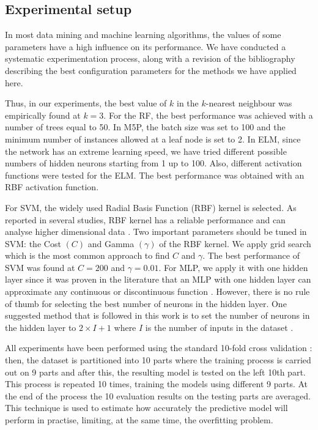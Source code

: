 \documentclass[a4paper,10pt,twocolumn,preprint,3p]{elsarticle}
\begin{document}

\subsection{Experimental setup}

In most data mining and machine learning algorithms, the values of some 
parameters have a high influence on its performance. We have conducted a 
systematic experimentation process, along with a revision of the bibliography 
describing the best configuration parameters for the methods we have applied here. 

Thus, in our experiments, the best value of $k$ in the $k$-nearest neighbour 
was empirically found at $k=3$. For the RF, the best performance was achieved with a number of trees equal to 50. In M5P, the batch size was set to 100 and the minimum number of instances allowed at a leaf node is set to 2. In ELM, since the network has an extreme learning speed, we have tried different possible numbers of hidden neurons starting from 1 up to 100. Also, different activation functions were tested for the ELM. The best performance was obtained with an RBF activation function.

For SVM, the widely used Radial Basis Function (RBF) kernel is selected. 
As reported in several studies, RBF kernel has a reliable performance and 
can analyse higher dimensional data \cite{yu2004ec,chao2015construction}. 
Two important parameters should be tuned in SVM: the Cost $(C)$ and 
Gamma $(\gamma)$ of the RBF kernel. 
We apply grid search which is the most common approach to find $C$ and $\gamma$. 
The best performance of SVM was found at $C=200$ and $\gamma = 0.01$. 
For MLP, we apply it with one hidden layer since it was proven in the literature 
that an MLP with one hidden layer can approximate any continuous or discontinuous
function \cite{hornik1989multilayer,mirjalili2014let}. However, there
is no rule of thumb for selecting the best number of neurons in the
hidden layer. One suggested method that is followed in this work is to
set the number of neurons in the hidden layer to $2 \times I + 1$
where $I$ is the number of inputs in the dataset
\cite{wdaa2008differential,mirjalili2014let,mirjalili2015effective}. 

All experiments have been performed using the standard 10-fold cross validation \cite{Geisser1993,Kohavi1995,Devijver1982}: then, the dataset is partitioned into 10 parts where the training process is carried out on 9 parts and after this, the resulting model is tested on the left 10th part. This process is repeated 10 times, training the models using different 9 parts. At the end of the process the 10 evaluation results on the testing parts are averaged. 
This technique is used to estimate how accurately the predictive model will perform in practise, limiting, at the same time, the overfitting problem.
\end{document}
